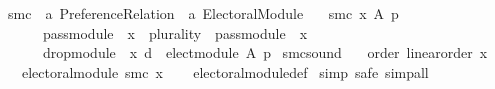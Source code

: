 \begin{isabellebody}
\ smc\ {\isacharcolon}{\kern0pt}{\isacharcolon}{\kern0pt}\ {\isachardoublequoteopen}{\isacharprime}{\kern0pt}a\ Preference{\isacharunderscore}{\kern0pt}Relation\ {\isasymRightarrow}\ {\isacharprime}{\kern0pt}a\ Electoral{\isacharunderscore}{\kern0pt}Module{\isachardoublequoteclose}\ \isanewline
\ \ {\isachardoublequoteopen}smc\ x\ A\ p\ {\isacharequal}{\kern0pt}\isanewline
\ \ \ \ \ \ {\isacharparenleft}{\kern0pt}{\isacharparenleft}{\kern0pt}{\isacharparenleft}{\kern0pt}{\isacharparenleft}{\kern0pt}{\isacharparenleft}{\kern0pt}{\isacharparenleft}{\kern0pt}pass{\isacharunderscore}{\kern0pt}module\ {}\ x{\isacharparenright}{\kern0pt}\ {\isasymtriangleright}\ {\isacharparenleft}{\kern0pt}{\isacharparenleft}{\kern0pt}plurality{\isasymdown}{\isacharparenright}{\kern0pt}\ {\isasymtriangleright}\ {\isacharparenleft}{\kern0pt}pass{\isacharunderscore}{\kern0pt}module\ {}\ x{\isacharparenright}{\kern0pt}{\isacharparenright}{\kern0pt}{\isacharparenright}{\kern0pt}\ {\isasymparallel}\isactrlsub {\isasymup}\isanewline
\ \ \ \ \ \ {\isacharparenleft}{\kern0pt}drop{\isacharunderscore}{\kern0pt}module\ {}\ x{\isacharparenright}{\kern0pt}{\isacharparenright}{\kern0pt}\ {\isasymcirclearrowleft}\isactrlsub {\isasymexists}\isactrlsub {\isacharbang}{\kern0pt}\isactrlsub d{\isacharparenright}{\kern0pt}\ {\isasymtriangleright}\ elect{\isacharunderscore}{\kern0pt}module{\isacharparenright}{\kern0pt}\ A\ p{\isacharparenright}{\kern0pt}{\isachardoublequoteclose}%
\isadelimdocument
%
\endisadelimdocument
%
\isatagdocument
%
\isamarkuptrue%
%
\endisatagdocument
{\isafolddocument}%
%
\isadelimdocument
%
\endisadelimdocument
{}\isamarkupfalse%
\ smc{\isacharunderscore}{\kern0pt}sound{\isacharcolon}{\kern0pt}\isanewline
\ \ \ order{\isacharcolon}{\kern0pt}\ {\isachardoublequoteopen}linear{\isacharunderscore}{\kern0pt}order\ x{\isachardoublequoteclose}\isanewline
\ \ \ {\isachardoublequoteopen}electoral{\isacharunderscore}{\kern0pt}module\ {\isacharparenleft}{\kern0pt}smc\ x{\isacharparenright}{\kern0pt}{\isachardoublequoteclose}\isanewline
%
\isadelimproof
\ \ %
\endisadelimproof
%
\isatagproof
{}\isamarkupfalse%
\ electoral{\isacharunderscore}{\kern0pt}module{\isacharunderscore}{\kern0pt}def\isanewline
{}\isamarkupfalse%
\ {\isacharparenleft}{\kern0pt}simp{\isacharcomma}{\kern0pt}\ safe{\isacharcomma}{\kern0pt}\ simp{\isacharunderscore}{\kern0pt}all{\isacharparenright}{\kern0pt}\isanewline
\ \ \isamarkupfalse%

\end{isabellebody}
